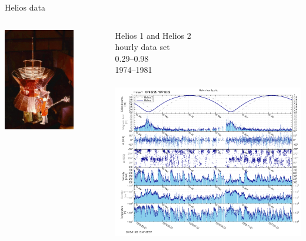 \begin{frame}[plain,c]{Helios data}{}
	\begin{columns}[c]
		
		\includegraphics[width=0.7\textwidth]{../figures_of_others/images/helios2.jpg}
		
		
		Helios 1 and Helios 2\\
		hourly data set \citep{Rosenbauer1977}\\
		\SIrange{0.29}{0.98}{\au}\\
		1974--1981\\\ 
		\includegraphics[width=\textwidth]{../talk_figures/hourly_H1_1976-02-25_1977-02-25_plot.png}
		
	\end{columns}
\end{frame}
